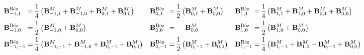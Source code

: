 \begin{scriptsize}
\begin{align*}
\petersLocalBezPointIndices{{-1},1\phantom{-}} =&\, \frac{1}{4}\left(\petersLocalPatchPointIndices{{-1},1} + \petersLocalPatchPointIndices{{-1},0} + \petersLocalPatchPointIndices{0,1} + \petersLocalPatchPointIndices{0,0}\right)
&
\petersLocalBezPointIndices{0,1\phantom{-}} =&\, \frac{1}{2}\left(\petersLocalPatchPointIndices{0,1} + \petersLocalPatchPointIndices{0,0}\right)
&
\petersLocalBezPointIndices{1,1\phantom{-}} =&\, \frac{1}{4}\left(\petersLocalPatchPointIndices{1,1} + \petersLocalPatchPointIndices{1,0} + \petersLocalPatchPointIndices{0,1} + \petersLocalPatchPointIndices{0,0}\right)
\\
\petersLocalBezPointIndices{{-1},0\phantom{-}} =&\, \frac{1}{2}\left(\petersLocalPatchPointIndices{{-1},0} +  \petersLocalPatchPointIndices{0,0}\right) 
&
\petersLocalBezPointIndices{0,0\phantom{-}} =&\,\phantom{\frac{1}{2}\Bigl(} \petersLocalPatchPointIndices{0,0}\phantom{\Bigr)}
&
\petersLocalBezPointIndices{1,0\phantom{-}} =&\, \frac{1}{2}\left(\petersLocalPatchPointIndices{1,0} + \petersLocalPatchPointIndices{0,0}\right)
\\
\petersLocalBezPointIndices{{-1},{-1}} =&\, \frac{1}{4}\left(\petersLocalPatchPointIndices{{-1},{-1}} + \petersLocalPatchPointIndices{{-1},0} + \petersLocalPatchPointIndices{0,{-1}} + \petersLocalPatchPointIndices{0,0}\right) 
&
\petersLocalBezPointIndices{0,{-1}} =&\, \frac{1}{2}\left(\petersLocalPatchPointIndices{0,{-1}} + \petersLocalPatchPointIndices{0,0}\right)
&
\petersLocalBezPointIndices{1,{-1}} =&\, \frac{1}{4}\left(\petersLocalPatchPointIndices{1,{-1}} + \petersLocalPatchPointIndices{1,0} + \petersLocalPatchPointIndices{0,{-1}} + \petersLocalPatchPointIndices{0,0}\right)
\end{align*}
\end{scriptsize}

